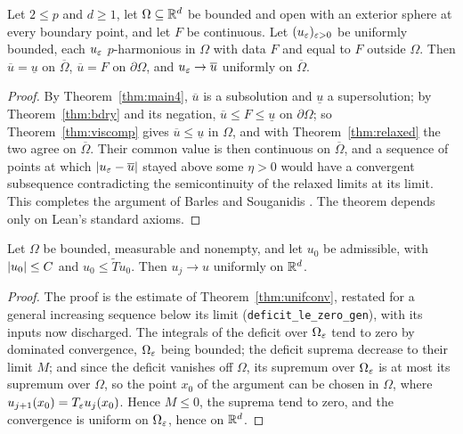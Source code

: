 \begin{theorem}[Convergence]\label{thm:main}
\leanok
Let $2 \le p$ and $d \ge 1$, let $\Omega \subseteq \mathbb{R}^d$ be bounded and open
with an exterior sphere at every boundary point, and let $F$ be continuous. Let
$(u_\varepsilon)_{\varepsilon > 0}$ be uniformly bounded, each $u_\varepsilon$ $p$-harmonious in
$\Omega$ with data $F$ and equal to $F$ outside $\Omega$. Then
$\overline u = \underline u$ on $\overline\Omega$, $\overline u = F$ on
$\partial\Omega$, and $u_\varepsilon \to \overline u$ uniformly on $\overline\Omega$.
\end{theorem}

\begin{proof}
\leanok
{}
By Theorem~\ref{thm:main4}, $\overline u$ is a subsolution and $\underline u$ a
supersolution; by Theorem~\ref{thm:bdry} and its negation,
$\overline u \le F \le \underline u$ on $\partial\Omega$; so
Theorem~\ref{thm:viscomp} gives $\overline u \le \underline u$ in $\Omega$, and
with Theorem~\ref{thm:relaxed} the two agree on $\overline\Omega$. Their common
value is then continuous on $\overline\Omega$, and a sequence of points at which
$|u_\varepsilon - \overline u|$ stayed above some $\eta > 0$ would have a convergent
subsequence contradicting the semicontinuity of the relaxed limits at its
limit. This completes the argument of Barles and Souganidis . The
theorem depends only on Lean's standard axioms.
\end{proof}


\begin{theorem}\label{thm:dirunif}
\leanok
Let $\Omega$ be bounded, measurable and nonempty, and let $u_0$ be admissible,
with $\left\lvert u_0\right\rvert \le C$ and $u_0 \le \widetilde T u_0$. Then $u_j \to u$
uniformly on $\mathbb{R}^d$.
\end{theorem}

\begin{proof}
\leanok
{}
The proof is the estimate of Theorem~\ref{thm:unifconv}, restated for a general
increasing sequence below its limit (\texttt{deficit\_le\_zero\_gen}), with
its inputs now discharged. The integrals of the deficit over $\Omega_\varepsilon$ tend
to zero by dominated convergence, $\Omega_\varepsilon$ being bounded; the deficit
suprema decrease to their limit $M$; and since the deficit vanishes off
$\Omega$, its supremum over $\Omega_\varepsilon$ is at most its supremum over
$\Omega$, so the point $x_0$ of the argument can be chosen in $\Omega$, where
$u_{j+1}(x_0) = T_\varepsilon u_j(x_0)$. Hence $M \le 0$, the suprema tend to zero, and
the convergence is uniform on $\Omega_\varepsilon$, hence on $\mathbb{R}^d$.
\end{proof}


